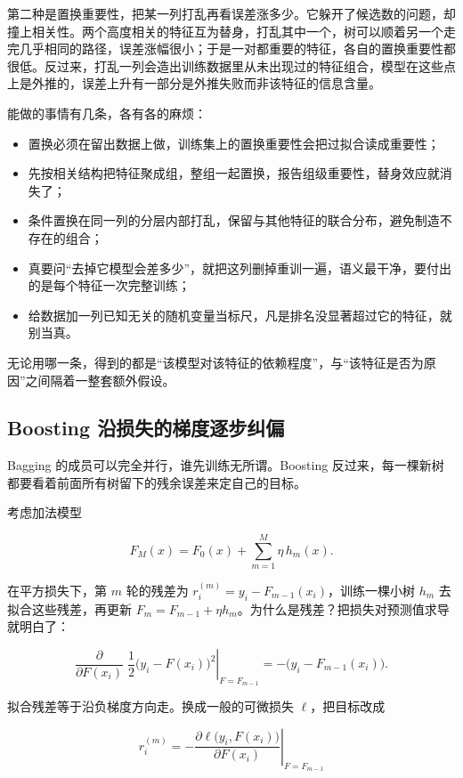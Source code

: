 第二种是置换重要性，把某一列打乱再看误差涨多少。它躲开了候选数的问题，却撞上相关性。两个高度相关的特征互为替身，打乱其中一个，树可以顺着另一个走完几乎相同的路径，误差涨幅很小；于是一对都重要的特征，各自的置换重要性都很低。反过来，打乱一列会造出训练数据里从未出现过的特征组合，模型在这些点上是外推的，误差上升有一部分是外推失败而非该特征的信息含量。

能做的事情有几条，各有各的麻烦：

\begin{itemize}
\tightlist
\item
  置换必须在留出数据上做，训练集上的置换重要性会把过拟合读成重要性；
\item
  先按相关结构把特征聚成组，整组一起置换，报告组级重要性，替身效应就消失了；
\item
  条件置换在同一列的分层内部打乱，保留与其他特征的联合分布，避免制造不存在的组合；
\item
  真要问``去掉它模型会差多少''，就把这列删掉重训一遍，语义最干净，要付出的是每个特征一次完整训练；
\item
  给数据加一列已知无关的随机变量当标尺，凡是排名没显著超过它的特征，就别当真。
\end{itemize}

无论用哪一条，得到的都是``该模型对该特征的依赖程度''，与``该特征是否为原因''之间隔着一整套额外假设。

\subsection{Boosting 沿损失的梯度逐步纠偏}

Bagging 的成员可以完全并行，谁先训练无所谓。Boosting 反过来，每一棵新树都要看着前面所有树留下的残余误差来定自己的目标。

考虑加法模型

\[
F_M(x) = F_0(x) + \sum_{m=1}^{M} \eta\, h_m(x).
\]

在平方损失下，第 \(m\) 轮的残差为 \(r_i^{(m)} = y_i - F_{m-1}(x_i)\)，训练一棵小树 \(h_m\) 去拟合这些残差，再更新 \(F_m = F_{m-1} + \eta h_m\)。为什么是残差？把损失对预测值求导就明白了：

\[
\left.\frac{\partial}{\partial F(x_i)}\;\frac12\bigl(y_i-F(x_i)\bigr)^2\right|_{F=F_{m-1}}
= -\bigl(y_i - F_{m-1}(x_i)\bigr).
\]

拟合残差等于沿负梯度方向走。换成一般的可微损失 \(\ell\)，把目标改成

\[
r_i^{(m)} = -\left.\frac{\partial \ell\bigl(y_i, F(x_i)\bigr)}{\partial F(x_i)}\right|_{F=F_{m-1}}
\]

